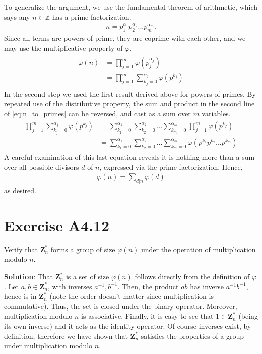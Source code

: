 \documentclass{book}
\begin{document}
    To generalize the argument, we use the fundamental theorem of arithmetic, which says any $n\in \mathbb{Z}$ has a prime factorization.
    \begin{align}
        n = p_1^{\alpha_1}p_2^{\alpha_2}...p_m^{\alpha_m}.
    \end{align}
    Since all terms are powers of prime, they are coprime with each other, and we may use the multiplicative property of $\varphi$.
    \begin{align} \label{eq:n_to_primes}
    \begin{aligned}
        \varphi(n) &= \prod_{j=1}^{m}\varphi(p_j^{\alpha_j}) \\
        &= \prod_{j=1}^m \sum_{k_j=0}^{\alpha_j}\varphi(p^{k_j})
    \end{aligned}
    \end{align}
    In the second step we used the first result derived above for powers of primes. By repeated use of the distributive property, the sum and product in the second line of \eqref{eq:n_to_primes} can be reversed, and cast as a sum over $m$ variables.
    \begin{align}
    \begin{aligned}
        \prod_{j=1}^m \sum_{k_j=0}^{\alpha_j}\varphi(p^{k_j}) &= \sum_{k_1=0}^{\alpha_1}\sum_{k_2=0}^{\alpha_2} \dots \sum_{k_m=0}^{\alpha_m} \prod_{j=1}^m \varphi(p^{k_j}) \\
        &= \sum_{k_1=0}^{\alpha_1}\sum_{k_2=0}^{\alpha_2} \dots \sum_{k_m=0}^{\alpha_m} \varphi(p^{k_1}p^{k_2}...p^{k_m})
    \end{aligned}
    \end{align}
    A careful examination of this last equation reveals it is nothing more than a sum over all possible divisors $d$ of $n$, expressed via the prime factorization. Hence,
    \begin{align}
        \varphi(n) = \sum_{d|n} \varphi(d)
    \end{align}
    as desired.

\section*{Exercise A4.12}
    Verify that $\textbf{Z}_n^*$ forms a group of size $\varphi(n)$ under the operation of multiplication modulo $n$.
    
    \textbf{Solution}: That $\textbf{Z}_n^*$ is a set of size $\varphi(n)$ follows directly from the definition of $\varphi$. Let $a,b \in \textbf{Z}_n^*$, with inverses $a^{-1}, b^{-1}$. Then, the product $ab$ has inverse $a^{-1}b^{-1}$, hence is in $\textbf{Z}_n^*$ (note the order doesn't matter since multiplication is commutative). Thus, the set is closed under the binary operator. Moreover, multiplication modulo $n$ is associative. Finally, it is easy to see that $1\in \textbf{Z}_n^*$ (being its own inverse) and it acts as the identity operator. Of course inverses exist, by definition, therefore we have shown that $\textbf{Z}_n^*$ satisfies the properties of a group under multiplication modulo $n$.
\end{document}
